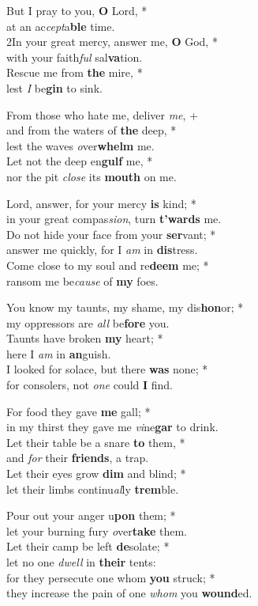 But I pray to you, \textbf{O} Lord, *\\
at an ac\emph{cept}a\textbf{ble} time. \\
2In your great mercy, answer me, \textbf{O} God, *\\
with your faith\emph{ful} sal\textbf{va}tion. \\
Rescue me from \textbf{the} mire, *\\
lest \emph{I} be\textbf{gin} to sink. 

From those who hate me, deliver \emph{me}, +\\
and from the waters of \textbf{the} deep, *\\
lest the waves \emph{o}ver\textbf{whelm} me. \\
Let not the deep en\textbf{gulf} me, *\\
nor the pit \emph{close} its \textbf{mouth} on me.

Lord, answer, for your mercy \textbf{is} kind; *\\
in your great compas\emph{sion}, turn \textbf{t'wards} me. \\
Do not hide your face from your \textbf{ser}vant; *\\
answer me quickly, for I \emph{am} in \textbf{dis}tress. \\
Come close to my soul and re\textbf{deem} me; *\\
ransom me be\emph{cause} of \textbf{my} foes.

You know my taunts, my shame, my dis\textbf{hon}or; *\\
my oppressors are \emph{all} be\textbf{fore} you. \\
Taunts have broken \textbf{my} heart; *\\
here I \emph{am} in \textbf{an}guish. \\
I looked for solace, but there \textbf{was} none; *\\
for consolers, not \emph{one} could \textbf{I} find.

For food they gave \textbf{me} gall; *\\
in my thirst they gave me \emph{vi}ne\textbf{gar} to drink. \\
Let their table be a snare \textbf{to} them, *\\
and \emph{for} their \textbf{friends}, a trap. \\
Let their eyes grow \textbf{dim} and blind; *\\
let their limbs continu\emph{al}ly \textbf{trem}ble.

Pour out your anger u\textbf{pon} them; *\\
let your burning fury \emph{o}ver\textbf{take} them. \\
Let their camp be left \textbf{de}solate; *\\
let no one \emph{dwell} in \textbf{their} tents: \\
for they persecute one whom \textbf{you} struck; *\\
they increase the pain of one \emph{whom} you \textbf{wound}ed.

